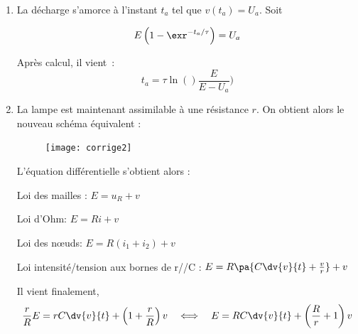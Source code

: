 \documentclass[a4paper, 10pt, garamond, oneside]{book}
\begin{document}
{\begin{enumerate}
		      \begin{figure}[htbp]
			      \centering
			      \texttt{[image: corrige1]}
		      \end{figure}

		      Loi des mailles : $E = u_{R}(t) + v(t)$ \\
		      Loi d'Ohm : $u_{R}(t) = Ri(t) \quad \Rightarrow \quad E = Ri(t) + v(t)$ \\
		      Loi intensité/tension pour C : $i(t)=C \dv{v}{t} \quad \Rightarrow \quad E = RC \dv{v}{t} + v(t)$

		      La solution générale est la somme de la solution homogène et d'une solution
		      particulière constante :

		      \[
			      v(t) = A \exr^{-t/\tau} +E \qet \tau = RC
		      \]
		      $A$ se détermine avec les conditions initiales $v(t=0) = 0$. Ainsi,
		      \[
			      v(0) = A +E = 0 \qdc  A= -E
		      \]
		      Finalement~:
		      \[
			      \boxed{v(t) = E\left(1-\exr^{-t/\tau}\right)}
		      \]
		\item
		      La décharge s'amorce à l'instant $t_{a}$ tel que $v(t_{a}) =
			      U_{a}$. Soit

		      \[
			      E\left(1-\exr^{-t_{a}/\tau}\right) = U_{a}
		      \]

		      Après calcul, il vient~:
		      \[
			      \boxed{t_{a} = \tau \ln()\frac{E}{E-U_{a}})}
		      \]
		\item
		      La lampe est maintenant assimilable à une résistance $r$. On obtient
		      alors le nouveau schéma équivalent :

		      \begin{figure}[htbp]
			      \centering
			      \texttt{[image: corrige2]}
		      \end{figure}

		      L'équation différentielle s'obtient alors :

		      Loi des mailles : $E = u_{R}+v$

		      Loi d'Ohm: $E=Ri+v$

		      Loi des nœuds: $E = R(i_1+i_2)+v$

		      Loi intensité/tension aux bornes de r//C :
		      $E = R\pa{C\dv{v}{t}+ \frac{v}{r}}+v$

		      Il vient finalement,
		      \[
			      \frac{r}{R}E = rC\dv{v}{t}+ \left(1+\frac{r}{R}\right)v
			      \quad \Longleftrightarrow \quad
			      E = RC \dv{v}{t} + \left(\frac{R}{r}+1\right) v
		      \]


\end{enumerate}}
\end{document}
